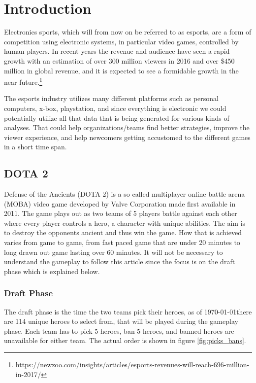 \documentclass[report.tex]{subfiles}
\begin{document}
\section*{\centering Introduction}

Electronics sports, which will from now on be referred to as esports, are a form of competition using electronic systems, in particular video games, controlled by human players. In recent years the revenue and audience have seen a rapid growth with an estimation of over 300 million viewers in 2016 and over \$450 million in global revenue, and it is expected to see a formidable growth in the near future.\footnote{https://newzoo.com/insights/articles/esports-revenues-will-reach-696-million-in-2017/}

The esports industry utilizes many different platforms such as personal computers, x-box, playstation, and since everything is electronic we could potentially utilize all that data that is being generated for various kinds of analyses. That could help organizations/teams find better strategies, improve the viewer experience, and help newcomers getting accustomed to the different games in a short time span.

\subsection*{DOTA 2}

Defense of the Ancients (DOTA 2) is a so called multiplayer online battle arena (MOBA) video game developed by Valve Corporation made first available in 2011. The game plays out as two teams of 5 players battle against each other where every player controls a hero, a character with unique abilities. The aim is to destroy the opponents ancient and thus win the game. How that is achieved varies from game to game, from fast paced game that are under 20 minutes to long drawn out game lasting over 60 minutes. It will not be necessary to understand the gameplay to follow this article since the focus is on the draft phase which is explained below.

\subsubsection*{Draft Phase}

The draft phase is the time the two teams pick their heroes, as of \today there are 114 unique heroes to select from, that will be played during the gameplay phase. Each team has to pick 5 heroes, ban 5 heroes, and banned heroes are unavailable for either team. The actual order is shown in figure \ref{fig:picks_bans}.
\end{document}
